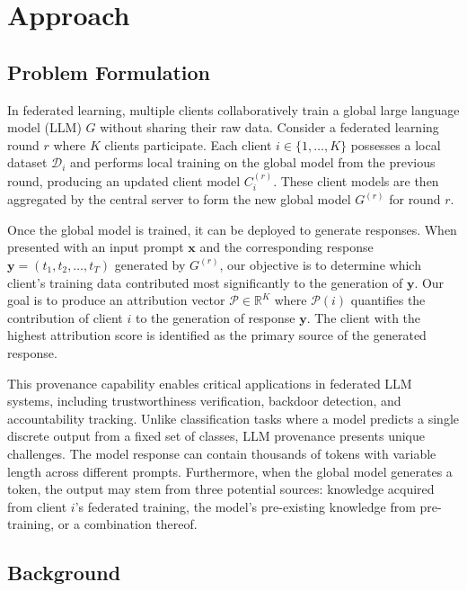 \section{Approach}

\subsection{Problem Formulation}

In federated learning, multiple clients collaboratively train a global large language model (LLM) $G$ without sharing their raw data. Consider a federated learning round $r$ where $K$ clients participate. Each client $i \in \{1, \ldots, K\}$ possesses a local dataset $\mathcal{D}_i$ and performs local training on the global model from the previous round, producing an updated client model $C_i^{(r)}$. These client models are then aggregated by the central server to form the new global model $G^{(r)}$ for round $r$.

Once the global model is trained, it can be deployed to generate responses. When presented with an input prompt $\mathbf{x}$ and the corresponding response $\mathbf{y} = (t_1, t_2, \ldots, t_T)$ generated by $G^{(r)}$, our objective is to determine which client's training data contributed most significantly to the generation of $\mathbf{y}$. Our goal is to produce an attribution vector $\mathcal{P} \in \mathbb{R}^K$ where $\mathcal{P}(i)$ quantifies the contribution of client $i$ to the generation of response $\mathbf{y}$. The client with the highest attribution score is identified as the primary source of the generated response.

This provenance capability enables critical applications in federated LLM systems, including trustworthiness verification, backdoor detection, and accountability tracking. Unlike classification tasks where a model predicts a single discrete output from a fixed set of classes, LLM provenance presents unique challenges. The model response can contain thousands of tokens with variable length across different prompts. Furthermore, when the global model generates a token, the output may stem from three potential sources: knowledge acquired from client $i$'s federated training, the model's pre-existing knowledge from pre-training, or a combination thereof.

\subsection{Background}

